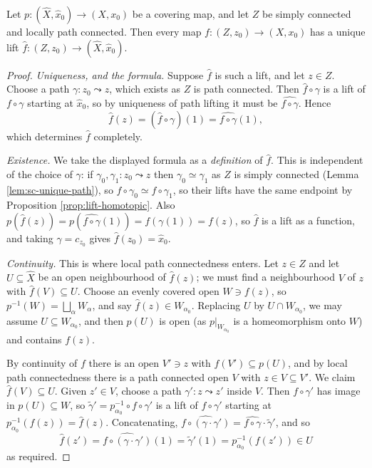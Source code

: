 \begin{proposition} \label{prop:sc-lifting}
	Let $p: (\hat X, \hat x_0) \to (X, x_0)$ be a covering map, and let $Z$ be simply connected and locally path connected. Then every map $f: (Z, z_0) \to (X, x_0)$ has a unique lift $\hat f: (Z, z_0) \to (\hat X, \hat x_0)$.
\end{proposition}
\begin{proof}
	\emph{Uniqueness, and the formula.} Suppose $\hat f$ is such a lift, and let $z \in Z$. Choose a path $\gamma: z_0 \leadsto z$, which exists as $Z$ is path connected. Then $\hat f \circ \gamma$ is a lift of $f \circ \gamma$ starting at $\hat x_0$, so by uniqueness of path lifting it must be $\widehat{f \circ \gamma}$. Hence
	$$
	\hat f(z) = (\hat f \circ \gamma)(1) = \widehat{f\circ\gamma}(1),
	$$
	which determines $\hat f$ completely.

	\emph{Existence.} We take the displayed formula as a \emph{definition} of $\hat f$. This is independent of the choice of $\gamma$: if $\gamma_0, \gamma_1: z_0 \leadsto z$ then $\gamma_0 \simeq \gamma_1$ as $Z$ is simply connected (Lemma \ref{lem:sc-unique-path}), so $f \circ \gamma_0 \simeq f\circ\gamma_1$, so their lifts have the same endpoint by Proposition \ref{prop:lift-homotopic}. Also $p(\hat f(z)) = p(\widehat{f\circ\gamma}(1)) = f(\gamma(1)) = f(z)$, so $\hat f$ is a lift as a function, and taking $\gamma = c_{z_0}$ gives $\hat f(z_0) = \hat x_0$.

	\emph{Continuity.} This is where local path connectedness enters. Let $z \in Z$ and let $U \subseteq \hat X$ be an open neighbourhood of $\hat f(z)$; we must find a neighbourhood $V$ of $z$ with $\hat f(V) \subseteq U$. Choose an evenly covered open $W \ni f(z)$, so $p^{-1}(W) = \bigsqcup_\alpha W_\alpha$, and say $\hat f(z) \in W_{\alpha_0}$. Replacing $U$ by $U \cap W_{\alpha_0}$, we may assume $U \subseteq W_{\alpha_0}$, and then $p(U)$ is open (as $p|_{W_{\alpha_0}}$ is a homeomorphism onto $W$) and contains $f(z)$.

	By continuity of $f$ there is an open $V' \ni z$ with $f(V') \subseteq p(U)$, and by local path connectedness there is a path connected open $V$ with $z \in V \subseteq V'$. We claim $\hat f(V) \subseteq U$. Given $z' \in V$, choose a path $\gamma': z \leadsto z'$ inside $V$. Then $f \circ \gamma'$ has image in $p(U) \subseteq W$, so $\tilde\gamma' = p_{\alpha_0}^{-1} \circ f \circ \gamma'$ is a lift of $f \circ \gamma'$ starting at $p_{\alpha_0}^{-1}(f(z)) = \hat f(z)$. Concatenating, $\widehat{f\circ(\gamma\cdot\gamma')} = \widehat{f\circ\gamma}\cdot\tilde\gamma'$, and so
	$$
	\hat f(z') = \widehat{f\circ(\gamma\cdot\gamma')}(1) = \tilde\gamma'(1) = p_{\alpha_0}^{-1}(f(z')) \in U
	$$
	as required.
\end{proof}

